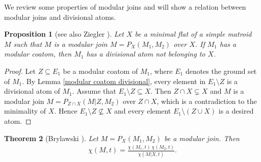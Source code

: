 \documentclass[11pt]{article}
\newtheorem{Theorem}{Theorem}[section]
\newtheorem{Proposition}[Theorem]{Proposition}
 { \theoremstyle{definition}
\newtheorem{Definition}[Theorem]{Definition}
\newtheorem{Example}[Theorem]{Example}
\newtheorem{Remark}[Theorem]{Remark}
\newtheorem{Question}[Theorem]{Question} }
\begin{document}
We review some properties of modular joins and will show a relation between modular joins and divisional atoms.

\begin{Proposition}[see also Ziegler {\cite[Lemma 3.10]{ziegler1991binary-potams}}]\label{Ziegler case of modular coatom}
Let $ X $ be a minimal flat of a simple matroid $ M $ such that $ M $ is a modular join $ M = P_{X}(M_{1}, M_{2}) $ over $ X $.
If $ M_{1} $ has a modular coatom, then $ M_{1} $ has a divisional atom not belonging to $ X $.
\end{Proposition}
\begin{proof}
Let $ Z \subseteq E_{1} $ be a modular coatom of $ M_{1} $, where $ E_{1} $ denotes the ground set of $ M_{1} $.
By Lemma \ref{modular coatom divisional}, every element in $ E_{1}\setminus Z $ is a divisional atom of $ M_{1} $.
Assume that $ E_{1}\setminus Z \subseteq X $.
Then $ Z \cap X \subsetneq X $ and $ M $ is a modular join $ M = P_{Z \cap X}(M|Z, M_{2}) $ over $ Z \cap X $, which is a contradiction to the minimality of $ X $.
Hence $ E_{1}\setminus Z \not\subseteq X $ and every element $ E_{1}\setminus(Z \cup X) $ is a desired atom.
\end{proof}

\begin{Theorem}[Brylawski {\cite[Theorem 7.8]{brylawski1975modular-totams}}]\label{Brylawski decomposition}
Let $ M = P_{X}(M_{1}, M_{2}) $ be a modular join.
Then
\begin{align*}
\chi(M,t) = \frac{\chi(M_{1},t) \, \chi(M_{2},t)}{\chi(M|X,t)}.
\end{align*}
\end{Theorem}
\end{document}
